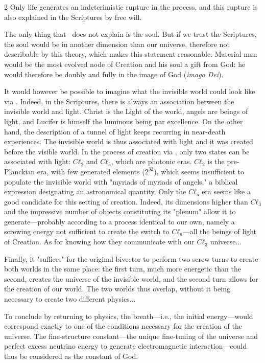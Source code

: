 \begin{multicols}{2}
	Only life generates an indeterimistic rupture in the process, and this rupture is also explained in the Scriptures by free will. \cite{vatican_libre_arbitre}
	
	The only thing that \PQ\ does not explain is the soul. But if we trust the Scriptures, the soul would be in another dimension than our universe, therefore not describable by this theory, which makes this statement reasonable. Material man would be the most evolved node of Creation and his soul a gift from God: he would therefore be doubly and fully in the image of God (\textit{imago Dei}).
	
	It would however be possible to imagine what the invisible world could look like via \PQ. Indeed, in the Scriptures, there is always an association between the invisible world and light\cite{aleteia_lumiere_ref}. Christ is the Light of the world, angels are beings of light, and Lucifer is himself the luminous being par excellence. On the other hand, the description of a tunnel of light keeps recurring in near-death experiences. The invisible world is thus associated with light and it was created before the visible world. In the process of creation via \PQ, only two states can be associated with light: $Cℓ_2$ and $Cℓ_5$, which are photonic eras. $Cℓ_2$ is the pre-Planckian era, with few generated elements ($2^{32}$), which seems insufficient to populate the invisible world with "myriads of myriads of angels," a biblical expression designating an astronomical quantity. Only the $Cℓ_5$ era seems like a good candidate for this setting of creation. Indeed, its dimensions higher than $Cℓ_3$ and the impressive number of objects constituting its "plenum" allow it to generate—probably according to a process identical to our own, namely a screwing energy not sufficient to create the switch to $Cℓ_6$—all the beings of light of Creation. As for knowing how they communicate with our $Cℓ_3$ universe...
	
	Finally, it "suffices" for the original bivector to perform two screw turns to create both worlds in the same place: the first turn, much more energetic than the second, creates the universe of the invisible world, and the second turn allows for the creation of our world. The two worlds thus overlap, without it being necessary to create two different physics...
	
	To conclude by returning to physics, the breath—i.e., the initial energy—would correspond exactly to one of the conditions necessary for the creation of the universe. The fine-structure constant—the unique fine-tuning of the universe and perfect excess neutrino energy to generate electromagnetic interaction—could thus be considered as the constant of God.
	

\end{multicols}
